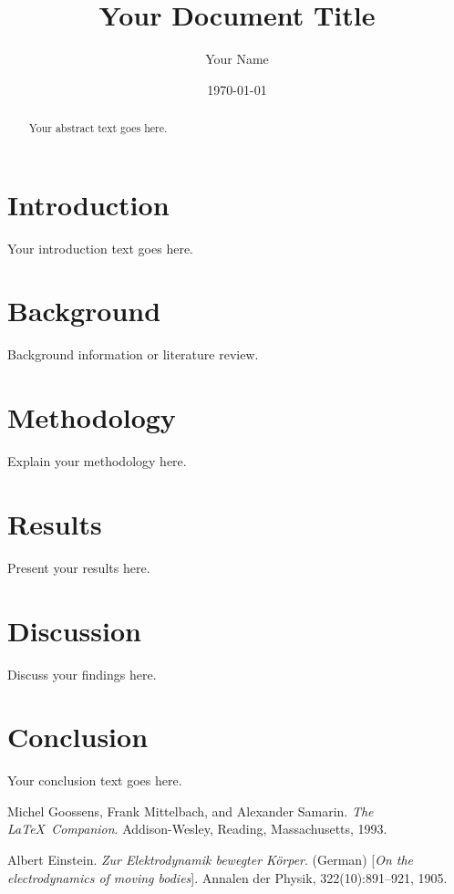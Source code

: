 \documentclass[12pt]{article}
\title{Your Document Title}
\author{Your Name}
\date{\today}
\begin{document}
\maketitle

\begin{abstract}
Your abstract text goes here.
\end{abstract}

\section{Introduction}
Your introduction text goes here.

\section{Background}
Background information or literature review.

\section{Methodology}
Explain your methodology here.

\section{Results}
Present your results here.

\section{Discussion}
Discuss your findings here.

\section{Conclusion}
Your conclusion text goes here.

\begin{thebibliography}{9}
Michel Goossens, Frank Mittelbach, and Alexander Samarin. 
\textit{The \LaTeX\ Companion}. 
Addison-Wesley, Reading, Massachusetts, 1993.
 
Albert Einstein. 
\textit{Zur Elektrodynamik bewegter K{\"o}rper}. (German) 
[\textit{On the electrodynamics of moving bodies}]. 
Annalen der Physik, 322(10):891–921, 1905.
\end{thebibliography}
\end{document}
